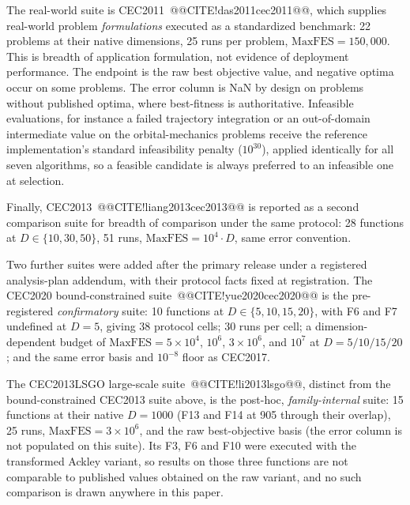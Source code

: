\documentclass[10pt,a4paper]{article}
\begin{document}
The real-world suite is CEC2011~@@CITE!das2011cec2011@@, which supplies
real-world problem \emph{formulations} executed as a standardized benchmark:
22 problems at their native dimensions, 25 runs per problem,
$\mathrm{MaxFES} = 150{,}000$. This is breadth of application formulation,
not evidence of deployment performance. The endpoint is the raw best objective
value, and negative optima occur on some problems. The error column
is NaN by design on problems without published optima, where
best-fitness is authoritative.
Infeasible evaluations, for instance a failed trajectory integration
or an out-of-domain intermediate value on the orbital-mechanics problems
receive the reference implementation's standard infeasibility penalty ($10^{30}$),
applied identically for all seven algorithms, so a feasible candidate is
always preferred to an infeasible one at selection.

Finally, CEC2013~@@CITE!liang2013cec2013@@ is reported as a second
comparison suite for breadth of comparison under the same protocol:
28 functions at $D \in \{10, 30, 50\}$, 51 runs,
$\mathrm{MaxFES} = 10^{4} \cdot D$, same error convention.

Two further suites were added after the primary release under a
registered analysis-plan addendum, with their protocol facts fixed at
registration. The CEC2020 bound-constrained suite~@@CITE!yue2020cec2020@@
is the pre-registered \emph{confirmatory} suite: 10 functions at
$D \in \{5, 10, 15, 20\}$, with F6 and F7 undefined at $D = 5$, giving
38 protocol cells; 30 runs per cell; a dimension-dependent budget of
$\mathrm{MaxFES} = 5 \times 10^{4}$, $10^{6}$, $3 \times 10^{6}$, and
$10^{7}$ at $D = 5/10/15/20$; and the same error basis and $10^{-8}$
floor as CEC2017.

The CEC2013LSGO large-scale suite~@@CITE!li2013lsgo@@, distinct from
the bound-constrained CEC2013 suite above, is the post-hoc,
\emph{family-internal} suite: 15 functions at their native $D = 1000$
(F13 and F14 at 905 through their overlap), 25 runs,
$\mathrm{MaxFES} = 3 \times 10^{6}$, and the raw best-objective basis
(the error column is not populated on this suite). Its F3, F6 and F10
were executed with the transformed Ackley variant, so results on those
three functions are not comparable to published values obtained on the
raw variant, and no such comparison is drawn anywhere in this paper.
\end{document}
